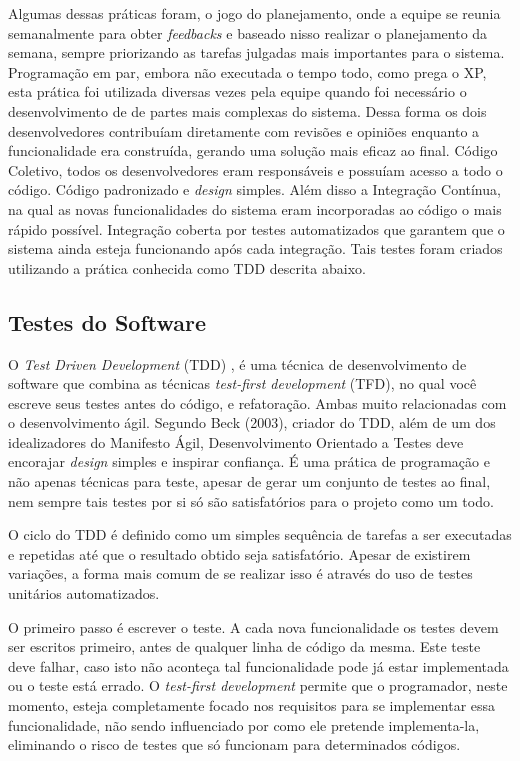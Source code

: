 Algumas dessas práticas foram, o jogo do planejamento, onde a equipe se reunia semanalmente para obter \textit{feedbacks} e baseado nisso realizar o planejamento da semana, sempre priorizando as tarefas julgadas mais importantes para o sistema. Programação em par, embora não executada o tempo todo, como prega o XP, esta prática foi utilizada diversas vezes pela equipe quando foi necessário o desenvolvimento de de partes mais complexas do sistema. Dessa forma os dois desenvolvedores contribuíam diretamente com revisões e opiniões enquanto a funcionalidade era construída, gerando uma solução mais eficaz ao final. Código Coletivo, todos os desenvolvedores eram responsáveis e possuíam acesso a todo o código. Código padronizado e \textit{design} simples. Além disso a Integração Contínua, na qual as novas funcionalidades do sistema eram incorporadas ao código o mais rápido possível. Integração coberta por testes automatizados que garantem que o sistema ainda esteja funcionando após cada integração. Tais testes foram criados utilizando a prática conhecida como TDD descrita abaixo.

\subsection{Testes do Software}

O \textit{Test Driven Development} (TDD) \cite{book:beck}, é uma técnica de desenvolvimento de software que combina as técnicas \textit{test-first development} (TFD), no qual você escreve seus testes antes do código, e refatoração. Ambas muito relacionadas com o desenvolvimento ágil. Segundo Beck (2003), criador do TDD, além de um dos idealizadores do Manifesto Ágil, Desenvolvimento Orientado a Testes deve encorajar \textit{design} simples e inspirar confiança. É uma prática de programação e não apenas técnicas para teste, apesar de gerar um conjunto de testes ao final, nem sempre tais testes por si só são satisfatórios para o projeto como um todo.

O ciclo do TDD é definido como um simples sequência de tarefas a ser executadas e repetidas até que o resultado obtido seja satisfatório. Apesar de existirem variações, a forma mais comum de se realizar isso é através do uso de testes unitários automatizados.

O primeiro passo é escrever o teste. A cada nova funcionalidade os testes devem ser escritos primeiro, antes de qualquer linha de código da mesma. Este teste deve falhar, caso isto não aconteça tal funcionalidade pode já estar implementada ou o teste está errado. O \textit{test-first development} permite que o programador, neste momento, esteja completamente focado nos requisitos para se implementar essa funcionalidade, não sendo influenciado por como ele pretende implementa-la, eliminando o risco de testes que só funcionam para determinados códigos.

